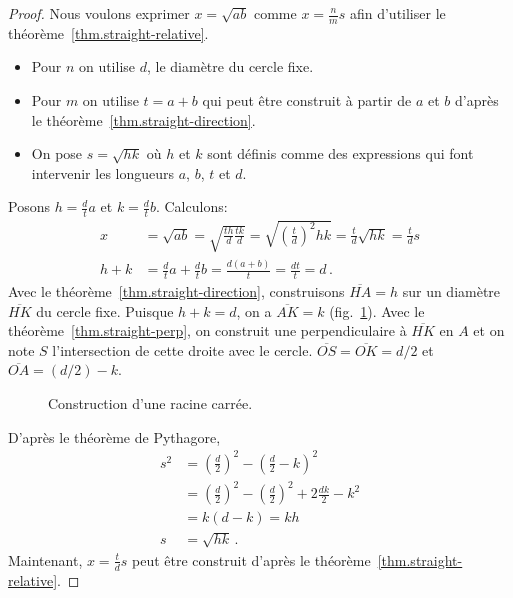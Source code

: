 \begin{proof}
Nous voulons exprimer $x=\sqrt{ab}$ comme $x=\displaystyle\frac{n}{m}s$ afin d'utiliser le théorème~\ref{thm.straight-relative}.
\begin{itemize}
\setlength{\itemsep}{0pt}
\item Pour $n$ on utilise $d$, le diamètre du cercle fixe.
\item Pour $m$ on utilise $t=a+b$ qui peut être construit à partir de $a$ et $b$ d'après le théorème~\ref{thm.straight-direction}.
\item On pose $s=\sqrt{hk}$ où $h$ et $k$ sont définis comme des expressions qui font intervenir  les longueurs $a$, $b$, $t$ et $d$.
\end{itemize}
Posons $h=\displaystyle\frac{d}{t}a$ et $k=\displaystyle\frac{d}{t}b$. Calculons:
\begin{align*}
x&=\sqrt{ab}=\sqrt{\frac{th}{d}\frac{tk}{d}}=\sqrt{\left(\frac{t}{d}\right)^2hk}=\frac{t}{d}\sqrt{hk}=\frac{t}{d}s\\
h+k &= \frac{d}{t}a + \frac{d}{t}b = \frac{d(a+b)}{t} = \frac{dt}{t} = d\,.
\end{align*}
Avec le théorème~\ref{thm.straight-direction}, construisons $\overline{HA}= h$ sur un diamètre $\overline{HK}$ du cercle fixe. Puisque $h+k=d$, on a $\overline{AK}=k$ (fig.~\ref{f.se-sqrt}). Avec le théorème~\ref{thm.straight-perp}, on construit une perpendiculaire à $\overline{HK}$ en $A$ et on note $S$ l'intersection de cette droite avec le cercle. $\overline{OS}=\overline{OK}=d/2$ et $\overline{OA}=(d/2)-k$. 
\begin{figure}[htbp]
\centering
{}
\caption{Construction d'une racine carrée.}\label{f.se-sqrt}
\end{figure}

D'après le théorème de Pythagore,
\begin{align*}
s^2&= \left(\frac{d}{2}\right)^2 - \left(\frac{d}{2}-k\right)^2\\
&= \left(\frac{d}{2}\right)^2 - \left(\frac{d}{2}\right)^2 + 2\frac{dk}{2} - k^2\\
&= k(d-k) = kh\\
s&=\sqrt{hk}\,.
\end{align*}
Maintenant, $x=\displaystyle\frac{t}{d}s$ peut être construit d'après le théorème~\ref{thm.straight-relative}.
\end{proof}

